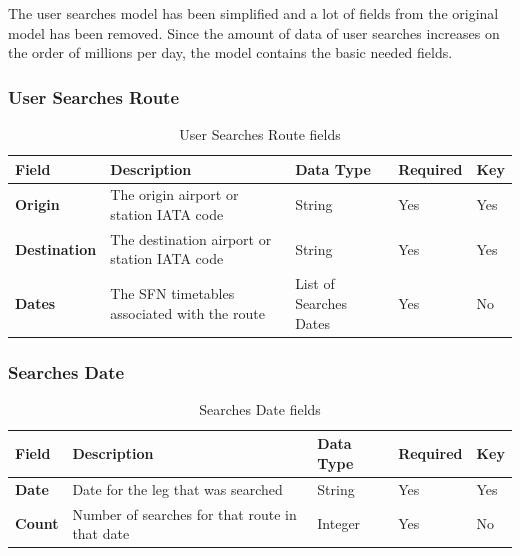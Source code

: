 The user searches model has been simplified and a lot of fields from the original model has been removed. Since the amount of data of user searches increases on the order of millions per day, the model contains the basic needed fields.

\subsubsection*{User Searches Route}

\begin{table}[H]
\centering
\begin{tabular}{|p{2.5cm}|p{4cm}|p{2.5cm}|p{2cm}|p{1.2cm}|}
\hline
\textbf{Field}       & \textbf{Description}                         & \textbf{Data Type}     & \textbf{Required} & \textbf{Key} \\ \hline
\textbf{Origin}      & The origin airport or station IATA code      & String                 & Yes               & Yes          \\ \hline
\textbf{Destination} & The destination airport or station IATA code & String                 & Yes               & Yes          \\ \hline
\textbf{Dates}       & The SFN timetables associated with the route & List of Searches Dates & Yes               & No           \\ \hline
\end{tabular}
\caption{User Searches Route fields}
\end{table}

\subsubsection*{Searches Date}

\begin{table}[H]
\centering
\begin{tabular}{|p{2.5cm}|p{4cm}|p{2.5cm}|p{2cm}|p{1.2cm}|}
\hline
\textbf{Field} & \textbf{Description}                           & \textbf{Data Type} & \textbf{Required} & \textbf{Key} \\ \hline
\textbf{Date}  & Date for the leg that was searched             & String             & Yes               & Yes          \\ \hline
\textbf{Count} & Number of searches for that route in that date & Integer            & Yes               & No           \\ \hline
\end{tabular}
\caption{Searches Date fields}
\end{table}







